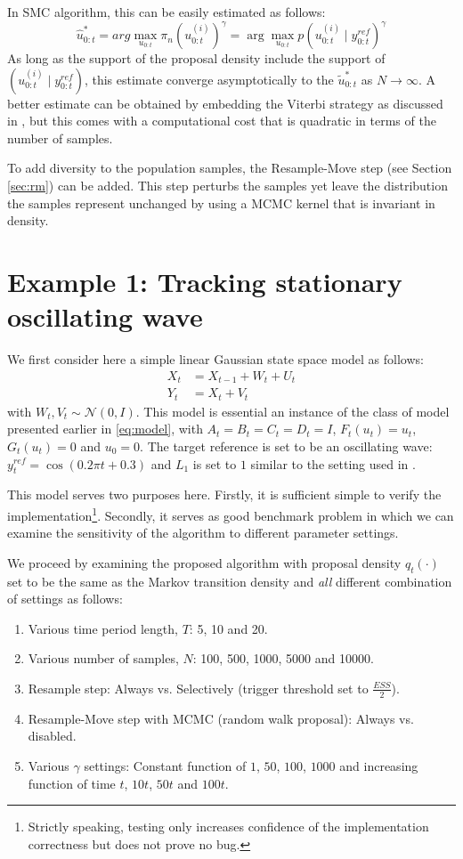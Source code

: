 In SMC algorithm, this can be easily estimated as follows:
\begin{equation}
\hat{u}^*_{0:t} = arg\max_{u_{0:t}} \pi_n(u^{(i)}_{0:t})^\gamma = \arg\max_{u_{0:t}} p(u^{(i)}_{0:t} \mid y^{ref}_{0:t})^\gamma
\end{equation}
As long as the support of the proposal density include the support of $(u^{(i)}_{0:t} \mid y^{ref}_{0:t})$, this estimate converge asymptotically to the $\tilde{u}^*_{0:t}$ as $N \to \infty$. A better estimate can be obtained by embedding the Viterbi strategy as discussed in \cite{SG01}, but this comes with a computational cost that is quadratic in terms of the number of samples.

To add diversity to the population samples, the Resample-Move step (see Section \ref{sec:rm}) can be added. This step perturbs the samples yet leave the distribution the samples represent unchanged by using a MCMC kernel that is invariant in density.

\section{Example 1: Tracking stationary oscillating wave}
\label{sec:exp1}
We first consider here a simple linear Gaussian state space model as follows:
\begin{align}
  X_t &= X_{t-1} + W_t + U_t \nonumber \\
  Y_t &= X_t + V_t
\label{eq:refnmodel}
\end{align}
with $W_t, V_t \sim \mathcal{N}(0,I)$. This model is essential an instance of the class of model presented earlier in \eqref{eq:model}, with $A_t=B_t=C_t=D_t=I$, $F_t(u_t)=u_t$, $G_t(u_t)=0$ and $u_0=0$. The target reference is set to be an oscillating wave: $y^{ref}_t = \cos(0.2 \pi t + 0.3)$ and $L_1$ is set to $1$ similar to the setting used in \cite{NK11}.

This model serves two purposes here. Firstly, it is sufficient simple to verify the implementation\footnote{Strictly speaking, testing only increases confidence of the implementation correctness but does not prove no bug.}. Secondly, it serves as good benchmark problem in which we can examine the sensitivity of the algorithm to different parameter settings.

We proceed by examining the proposed algorithm with proposal density $q_t(\cdot)$ set to be the same as the Markov transition density and \emph{all} different combination of settings as follows:
\begin{enumerate}
\item Various time period length, $T$: 5, 10 and 20.
\item Various number of samples, $N$: 100, 500, 1000, 5000 and 10000.
\item Resample step: Always vs. Selectively (trigger threshold set to $\frac{ESS}{2}$).
\item Resample-Move step with MCMC (random walk proposal): Always vs. disabled.
\item Various $\gamma$ settings: Constant function of $1$, $50$, $100$, $1000$ and increasing function of time $t$, $10t$, $50t$ and $100t$. 
\end{enumerate}

